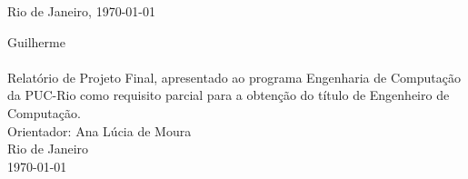 \documentclass[11pt]{article}
\begin{document}
\begin{titlepage}


{\large Rio de Janeiro, \today}\\[3cm] %



\vfill %

\end{titlepage}



\newpage

\begin{flushright}
\vspace*{\fill}
{\LARGE Guilherme }
\\[2cm]
{\huge \titlename}
\\[3cm]
Relatório de Projeto Final, apresentado ao programa
Engenharia de Computação da PUC-Rio como requisito
parcial para a obtenção do título de Engenheiro de Computação.
\\[1cm]
Orientador: Ana Lúcia de Moura
\\[1cm]
Rio de Janeiro
\\\today
\vspace*{\fill}

\end{flushright}
\end{document}
